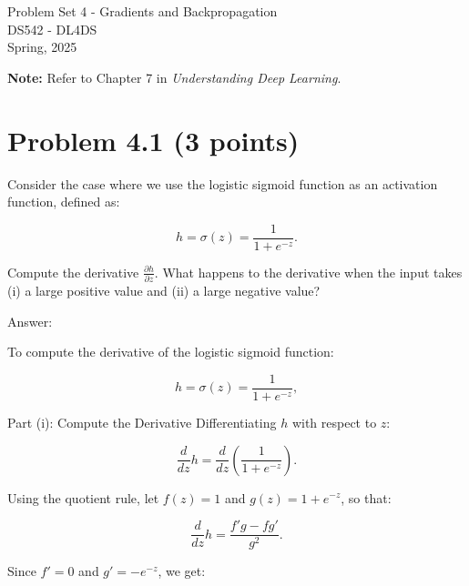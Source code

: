 \documentclass[10pt]{article}
\begin{document}
\begin{center}
    \LARGE {Problem Set 4 - Gradients and Backpropagation} \\[1em]
    \Large{DS542 - DL4DS} \\[0.5em]
    \large Spring, 2025
\end{center}

\vspace{2em}

\noindent\textbf{Note:} Refer to Chapter 7 in \textit{Understanding Deep Learning}.

\vspace{2em}

\section*{Problem 4.1 (3 points)}

Consider the case where we use the logistic sigmoid function as an activation function, defined as:

\begin{equation}
h = \sigma(z) = \frac{1}{1 + e^{-z}}.
\end{equation}

\noindent Compute the derivative \( \frac{\partial h}{\partial z} \). What happens
to the derivative when the input takes (i) a large positive value and (ii) a large negative value?

\vspace{5em}

\noindent  Answer: 

To compute the derivative of the logistic sigmoid function:

\begin{equation}
    h = \sigma(z) = \frac{1}{1 + e^{-z}},
\end{equation}

\noindent Part (i): Compute the Derivative
Differentiating $h$ with respect to $z$:

\begin{equation}
    \frac{d}{dz} h = \frac{d}{dz} \left( \frac{1}{1 + e^{-z}} \right).
\end{equation}

Using the quotient rule, let $f(z) = 1$ and $g(z) = 1 + e^{-z}$, so that:

\begin{equation}
    \frac{d}{dz} h = \frac{f' g - f g'}{g^2}.
\end{equation}

Since $f' = 0$ and $g' = -e^{-z}$, we get:
\end{document}
